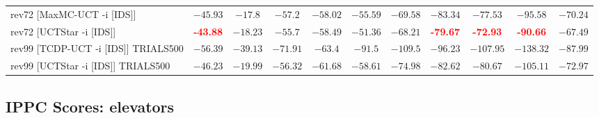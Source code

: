 \documentclass{article}
\begin{document}
\begin{tabular}{|l|r@{$\pm$}rr@{$\pm$}rr@{$\pm$}rr@{$\pm$}rr@{$\pm$}rr@{$\pm$}rr@{$\pm$}rr@{$\pm$}rr@{$\pm$}rr@{$\pm$}r|}
rev72 [MaxMC-UCT -i [IDS]]
& \multicolumn{2}{c}{$-45.93$}
& \multicolumn{2}{c}{$-17.8$}
& \multicolumn{2}{c}{$-57.2$}
& \multicolumn{2}{c}{$-58.02$}
& \multicolumn{2}{c}{$-55.59$}
& \multicolumn{2}{c}{$-69.58$}
& \multicolumn{2}{c}{$-83.34$}
& \multicolumn{2}{c}{$-77.53$}
& \multicolumn{2}{c}{$-95.58$}
& \multicolumn{2}{c|}{$-70.24$}
\\
rev72 [UCTStar -i [IDS]]
& \multicolumn{2}{c}{\textbf{\textcolor{red}{-43.88}}}
& \multicolumn{2}{c}{$-18.23$}
& \multicolumn{2}{c}{$-55.7$}
& \multicolumn{2}{c}{$-58.49$}
& \multicolumn{2}{c}{$-51.36$}
& \multicolumn{2}{c}{$-68.21$}
& \multicolumn{2}{c}{\textbf{\textcolor{red}{-79.67}}}
& \multicolumn{2}{c}{\textbf{\textcolor{red}{-72.93}}}
& \multicolumn{2}{c}{\textbf{\textcolor{red}{-90.66}}}
& \multicolumn{2}{c|}{$-67.49$}
\\
\hline
rev99 [TCDP-UCT -i [IDS]] TRIALS500
& \multicolumn{2}{c}{$-56.39$}
& \multicolumn{2}{c}{$-39.13$}
& \multicolumn{2}{c}{$-71.91$}
& \multicolumn{2}{c}{$-63.4$}
& \multicolumn{2}{c}{$-91.5$}
& \multicolumn{2}{c}{$-109.5$}
& \multicolumn{2}{c}{$-96.23$}
& \multicolumn{2}{c}{$-107.95$}
& \multicolumn{2}{c}{$-138.32$}
& \multicolumn{2}{c|}{$-87.99$}
\\
rev99 [UCTStar -i [IDS]] TRIALS500
& \multicolumn{2}{c}{$-46.23$}
& \multicolumn{2}{c}{$-19.99$}
& \multicolumn{2}{c}{$-56.32$}
& \multicolumn{2}{c}{$-61.68$}
& \multicolumn{2}{c}{$-58.61$}
& \multicolumn{2}{c}{$-74.98$}
& \multicolumn{2}{c}{$-82.62$}
& \multicolumn{2}{c}{$-80.67$}
& \multicolumn{2}{c}{$-105.11$}
& \multicolumn{2}{c|}{$-72.97$}
\\
\hline
\end{tabular}%

\bigskip

\subsection*{IPPC Scores: elevators}
\end{document}
